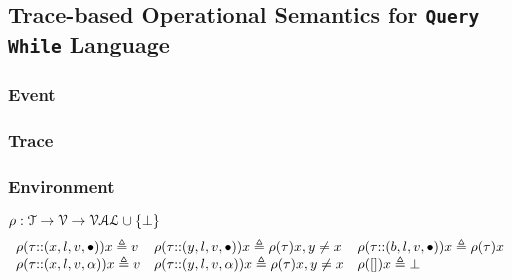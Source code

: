 \subsection{Trace-based Operational Semantics for {\tt Query While} Language}

\subsubsection{Event}


\subsubsection{Trace}


\subsubsection{Environment} 
$ \rho : {\mathcal{T}}  \to \mathcal{V} \to \mathcal{VAL} \cup \{\bot\}$
\[
\begin{array}{lll}
\rho(\mathtt{\tau}  {\small ::} (x, l, v, \bullet)) x \triangleq v
&
\rho(\mathtt{\tau} {\small ::} (y, l, v, \bullet)) x \triangleq \rho(\mathtt{\tau}) x, y \neq x
&
\rho(\mathtt{\tau} {\small ::} (b, l, v, \bullet)) x \triangleq \rho(\mathtt{\tau}) x
\\
\rho(\mathtt{\tau} {\small ::} (x, l, v, \alpha)) x \triangleq v
&
\rho(\mathtt{\tau} {\small ::} (y, l, v, \alpha)) x \triangleq \rho(\mathtt{\tau}) x, y \neq x
&
\rho({[]} ) x \triangleq \bot
\end{array}
\]

